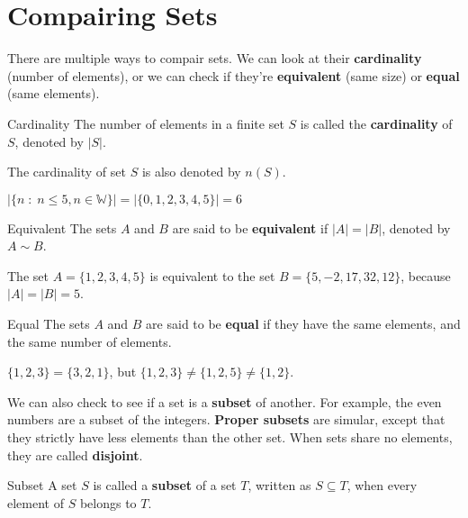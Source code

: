 \section{Compairing Sets}

There are multiple ways to compair sets. We can look at their {\bf cardinality} (number of elements), or we can check if they're {\bf equivalent} (same size) or {\bf equal} (same elements).

\begin{boxdefine}{Cardinality}{}
	The number of elements in a finite set $S$ is called the {\bf cardinality} of $S$, denoted by $|S|$.
\end{boxdefine}

\begin{boxnotation*}{}{}
	The cardinality of set $S$ is also denoted by $n(S)$.
\end{boxnotation*}

\begin{boxexample}{}{}
	$|\{ n \;:\; n \leq 5, n \in \mathbb{W}\}| = |\{0,1,2,3,4,5\}| = 6$
\end{boxexample}


\begin{boxdefine}{Equivalent}{}
	The sets $A$ and $B$ are said to be {\bf equivalent} if $|A| = |B|$, denoted by $A \sim B$.
\end{boxdefine}

\begin{boxexample}{}{}
	The set $A = \{1,2,3,4,5\}$ is equivalent to the set $B = \{5,-2,17,32,12\}$, because $|A| = |B| = 5$.
\end{boxexample}


\begin{boxdefine}{Equal}{}
	The sets $A$ and $B$ are said to be {\bf equal} if they have the same elements, and the same number of elements.
\end{boxdefine}

\begin{boxexample}{}{}
	$\{1,2,3\} = \{3,2,1\}$, but $\{1,2,3\} \ne \{1,2,5\} \ne \{1,2\}$.
\end{boxexample}

We can also check to see if a set is a {\bf subset} of another. For example, the even numbers are a subset of the integers. {\bf Proper subsets} are simular, except that they strictly have less elements than the other set. When sets share no elements, they are called {\bf disjoint}.

\begin{boxdefine}{Subset}{}
	A set $S$ is called a {\bf subset} of a set $T$, written as $S \subseteq T$, when every element of $S$ belongs to $T$.
\end{boxdefine}

